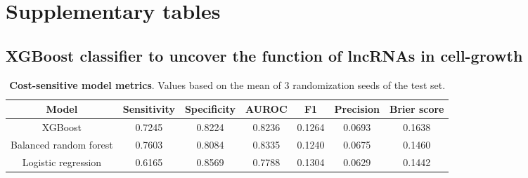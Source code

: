 \clearpage

\section[Supplementary tables]{Supplementary tables}
\label{sec:supp_tables}

\subsection{XGBoost classifier to uncover the function of lncRNAs in cell-growth}
\label{sec:sup_tables_part_2}

\begin{table}[!htb]
  \caption[Cost-sensitive model metrics]{\textbf{Cost-sensitive model metrics}. Values based on the mean of 3 randomization seeds of the test set.}
  \begin{scriptsize}
    \begin{tabulary}{0.95\linewidth}{ccccccc}
      \textbf{Model} & \textbf{Sensitivity} & \textbf{Specificity} & \textbf{AUROC} & \textbf{F1}  & \textbf{Precision} & \textbf{Brier score}\\ \hline
      XGBoost & 0.7245 & 0.8224 & 0.8236 & 0.1264 & 0.0693 & 0.1638 \\
      Balanced random forest & 0.7603 & 0.8084 & 0.8335 & 0.1240 & 0.0675 & 0.1460 \\
      Logistic regression & 0.6165 & 0.8569 & 0.7788 & 0.1304 & 0.0629 & 0.1442 \\
    \end{tabulary}
  \end{scriptsize}
  \label{tab:summary_cost-sensitive_models}
\end{table}

